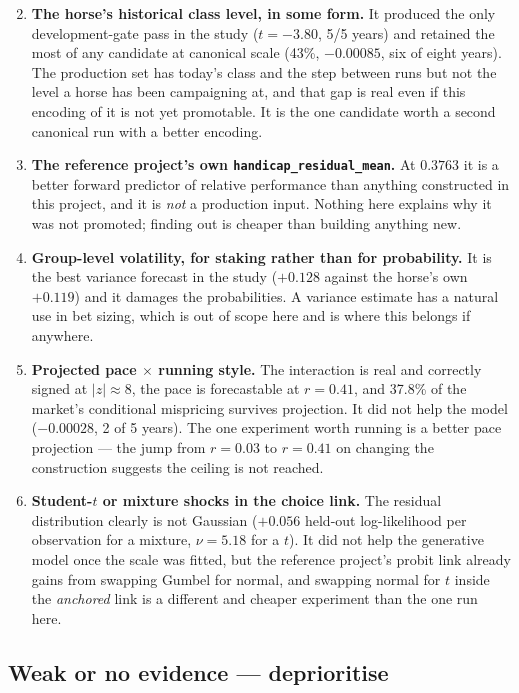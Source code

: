 \documentclass[11pt,a4paper]{article}
\begin{document}
\begin{enumerate}\setcounter{enumi}{1}\itemsep3pt
\item \textbf{The horse's historical class level, in some form.} It produced the only
development-gate pass in the study ($t=-3.80$, 5/5 years) and retained the most of
any candidate at canonical scale (43\%, $-0.00085$, six of eight years). The
production set has today's class and the step between runs but not the level a horse
has been campaigning at, and that gap is real even if this encoding of it is not yet
promotable. It is the one candidate worth a second canonical run with a better
encoding.

\item \textbf{The reference project's own \texttt{handicap\_residual\_mean}.} At
$0.3763$ it is a better forward predictor of relative performance than anything
constructed in this project, and it is \emph{not} a production input. Nothing here
explains why it was not promoted; finding out is cheaper than building anything new.

\item \textbf{Group-level volatility, for staking rather than for probability.} It
is the best variance forecast in the study ($+0.128$ against the horse's own
$+0.119$) and it damages the probabilities. A variance estimate has a natural use in
bet sizing, which is out of scope here and is where this belongs if anywhere.
\item \textbf{Projected pace $\times$ running style.} The interaction is real and
correctly signed at $|z|\approx8$, the pace is forecastable at $r=0.41$, and
37.8\% of the market's conditional mispricing survives projection. It did not help
the model ($-0.00028$, 2 of 5 years). The one experiment worth running is a better
pace projection --- the jump from $r=0.03$ to $r=0.41$ on changing the construction
suggests the ceiling is not reached.

\item \textbf{Student-$t$ or mixture shocks in the choice link.} The residual
distribution clearly is not Gaussian ($+0.056$ held-out log-likelihood per
observation for a mixture, $\nu=5.18$ for a $t$). It did not help the generative
model once the scale was fitted, but the reference project's probit link already
gains from swapping Gumbel for normal, and swapping normal for $t$ inside the
\emph{anchored} link is a different and cheaper experiment than the one run here.
\end{enumerate}

\subsection*{Weak or no evidence --- deprioritise}
\end{document}
